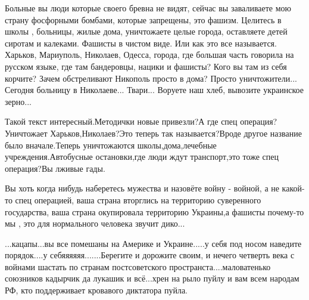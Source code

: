 Больные вы люди которые своего бревна не видят, сейчас вы заваливаете мою страну фосфорными бомбами, которые запрещены, это фашизм.
Целитесь в школы , больницы, жилые дома, уничтожаете целые города, оставляете детей сиротам и калеками. Фашисты в чистом виде. Или как это все называется. Харьков, Мариуполь, Николаев, Одесса, города, где большая часть говорила на русском языке, где там бандеровцы, нацики и фашисты? Кого вы там из себя корчите? Зачем обстреливают Никополь просто в дома? Просто уничтожители... Сегодня больницу в Николаеве... Твари...
Воруете наш хлеб, вывозите украинское зерно...

Такой текст интересный.Методички новые привезли?А где спец операция?Уничтожает
Харьков,Николаев?Это теперь так называется?Вроде другое название было
вначале.Теперь уничтожаются школы,дома,лечебные учреждения.Автобусные
остановки,где люди ждут транспорт,это тоже спец операция?Вы лживые гады.

Вы хоть когда нибудь наберетесь мужества и назовёте войну - войной, а не
какой-то спец операцией, ваша страна вторглись на территорию суверенного
государства, ваша страна окупировала территорию Украины,а фашисты почему-то мы
, это для нормального человека звучит дико...

...кацапы...вы все помешаны на Америке и Украине.....у себя под носом наведите
порядок....у себяяяяяя.......Берегите и дорожите своим, и нечего четверть века
с войнами шастать по странам постсоветского пространста....маловатенько
союзников кадырчик да лукашик и всё...хрен на рыло пуйлу и вам всем народам РФ,
кто поддерживает кровавого диктатора пуйла.

